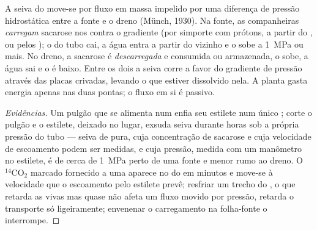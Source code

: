 \begin{theorem}\label{thm:b1:plant-transport:pressureflow}
A seiva do  move-se por fluxo em massa impelido por uma
diferença de pressão hidrostática entre a fonte e o dreno (Münch,
1930). Na fonte, as  companheiras \emph{carregam} sacarose nos
 contra o gradiente (por simporte com prótons, a partir
do , ou pelos ); o  do tubo cai,
a água entra a partir do  vizinho e o  sobe a
\qty{1}{MPa} ou mais. No dreno, a sacarose é \emph{descarregada} e
consumida ou armazenada, o  sobe, a água sai e o
 é baixo. Entre os dois a seiva corre a favor do gradiente
de pressão através das placas crivadas, levando o que estiver
dissolvido nela. A planta gasta energia apenas nas duas pontas; o
fluxo em si é passivo.
\end{theorem}
\begin{proof}[Evidências]
Um pulgão que se alimenta num  enfia seu estilete num único ; corte o pulgão e o estilete, deixado no lugar, exsuda seiva
durante horas sob a própria pressão do tubo --- seiva de  pura,
cuja concentração de sacarose e cuja velocidade de escoamento podem
ser medidas, e cuja pressão, medida com um manômetro no estilete, é de
cerca de \qty{1}{MPa} perto de uma fonte e menor rumo ao dreno. O
$\mathrm{^{14}CO_2}$ marcado fornecido a uma  aparece no 
do  em minutos e move-se à velocidade que o escoamento pelo
estilete prevê; resfriar um trecho do , o que retarda as 
vivas mas quase não afeta um fluxo movido por pressão, retarda o
transporte só ligeiramente; envenenar o carregamento na folha-fonte o
interrompe.
\end{proof}

